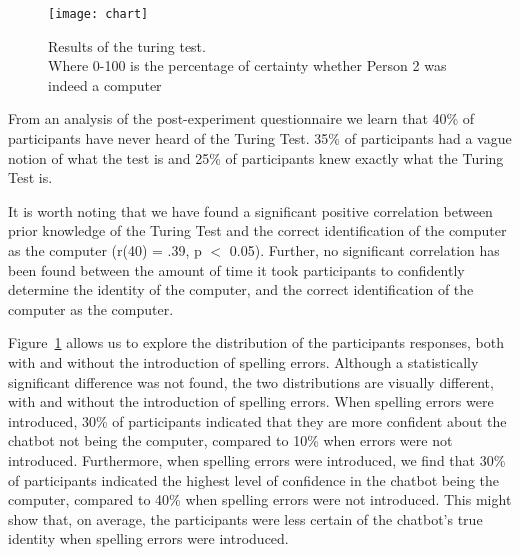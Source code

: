 \begin{figure}[ht]
   \begin{center}
      \texttt{[image: chart]}
   \end{center}
   \caption{Results of the turing test.\\ Where 0-100 is the percentage of certainty whether Person 2 was indeed a computer}
   \label{chart}
\end{figure}

From an analysis of the post-experiment questionnaire we learn that 40\% of participants have never heard of the Turing Test. 35\% of participants had a vague notion of what the test is and 25\% of participants knew exactly what the Turing Test is.

It is worth noting that we have found a significant positive correlation between prior knowledge of the Turing Test and the correct identification of the computer as the computer (r(40) = .39, p $<$ 0.05). Further, no significant correlation has been found between the amount of time it took participants to confidently determine the identity of the computer, and the correct identification of the computer as the computer.

Figure~\ref{chart} allows us to explore the distribution of the participants responses, both with and without the introduction of spelling errors. Although a statistically significant difference was not found, the two distributions are visually different, with and without the introduction of spelling errors. When spelling errors were introduced, 30\% of participants indicated that they are more confident about the chatbot not being the computer, compared to 10\% when errors were not introduced. Furthermore, when spelling errors were introduced, we find that 30\% of participants indicated the highest level of confidence in the chatbot being the computer, compared to 40\% when spelling errors were not introduced. This might show that, on average, the participants were less certain of the chatbot's true identity when spelling errors were introduced.
